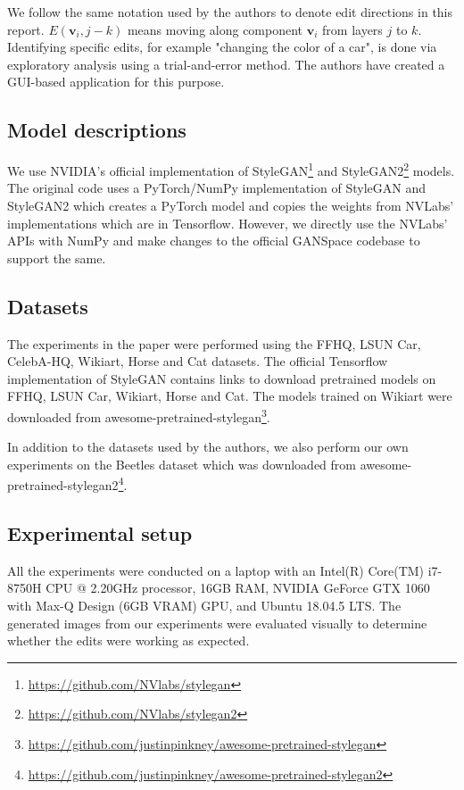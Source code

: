 We follow the same notation used by the authors to denote edit directions in this report. $E(\textbf{v}_{i}, j-k)$ means moving along component $\textbf{v}_{i}$ from layers $j$ to $k$. Identifying specific edits, for example "changing the color of a car", is done via exploratory analysis using a trial-and-error method. The authors have created a GUI-based application for this purpose.

\subsection{Model descriptions}

We use NVIDIA's official implementation of StyleGAN\footnote{\url{https://github.com/NVlabs/stylegan}} and StyleGAN2\footnote{\url{https://github.com/NVlabs/stylegan2}} models.
The original code uses a PyTorch/NumPy implementation of StyleGAN and StyleGAN2 which creates a PyTorch model and copies the weights from NVLabs' implementations which are in Tensorflow. However, we directly use the NVLabs' APIs with NumPy and make changes to the official GANSpace codebase to support the same.

\subsection{Datasets}

The experiments in the paper were performed using the FFHQ, LSUN Car, CelebA-HQ, Wikiart, Horse and Cat datasets. The official Tensorflow implementation of StyleGAN contains links to download pretrained models on FFHQ, LSUN Car, Wikiart, Horse and Cat. The models trained on Wikiart were downloaded from awesome-pretrained-stylegan\footnote{\url{https://github.com/justinpinkney/awesome-pretrained-stylegan}}.

In addition to the datasets used by the authors, we also perform our own experiments on the Beetles dataset which was downloaded from awesome-pretrained-stylegan2\footnote{\url{https://github.com/justinpinkney/awesome-pretrained-stylegan2}}.


\subsection{Experimental setup}

All the experiments were conducted on a laptop with an Intel(R) Core(TM) i7-8750H CPU @ 2.20GHz processor, 16GB RAM, NVIDIA GeForce GTX 1060 with Max-Q Design (6GB VRAM) GPU, and Ubuntu 18.04.5 LTS. The generated images from our experiments were evaluated visually to determine whether the edits were working as expected.

